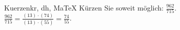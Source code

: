 \begin{MAufgabe}{Kuerzen}{kr, dh, MaTeX}
K\"urzen Sie soweit m\"oglich: $\frac{962}{715}$.\\ 
\ifLsg\MLoesung
\quad $\frac{962}{715}=\frac{(13)\cdot(74)}{(13)\cdot(55)}=\frac{74}{55}$.\else\relax\fi
 \end{MAufgabe}